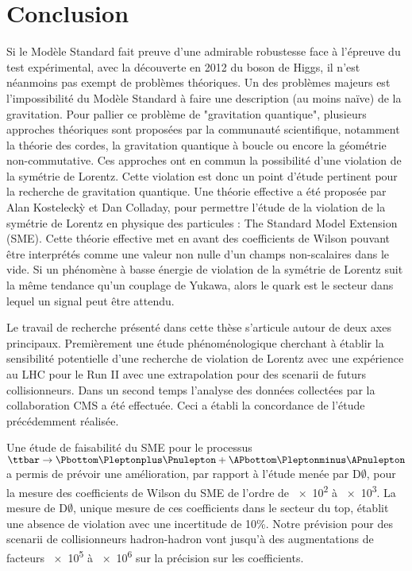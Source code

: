 \chapter*{Conclusion}

Si le Modèle Standard fait preuve d'une admirable robustesse face à l'épreuve du test expérimental, avec la découverte en 2012 du boson de Higgs, il n'est néanmoins pas exempt de problèmes théoriques. Un des problèmes majeurs est l'impossibilité du Modèle Standard à faire une description (au moins naïve) de la gravitation. Pour pallier ce problème de "gravitation quantique", plusieurs approches théoriques sont proposées par la communauté scientifique, notamment la théorie des cordes, la gravitation quantique à boucle ou encore la géométrie non-commutative. Ces approches ont en commun la possibilité d'une violation de la symétrie de Lorentz. Cette violation est donc un point d'étude pertinent pour la recherche de gravitation quantique. 
Une théorie effective a été proposée par Alan Kosteleck\`y et Dan Colladay, pour permettre l'étude de la violation de la symétrie de Lorentz en physique des particules : The Standard Model Extension (SME). Cette théorie effective met en avant des coefficients de Wilson pouvant être interprétés comme une valeur non nulle d'un champs non-scalaires dans le vide. Si un phénomène à basse énergie de violation de la symétrie de Lorentz suit la même tendance qu'un couplage de Yukawa, alors le quark \Ptop est le secteur dans lequel un signal peut être attendu.
\newline

Le travail de recherche présenté dans cette thèse s'articule autour de deux axes principaux. Premièrement une étude phénoménologique cherchant à établir la sensibilité potentielle d'une recherche de violation de Lorentz avec une expérience au LHC pour le Run II avec une extrapolation pour des scenarii de futurs collisionneurs. Dans un second temps l'analyse des données collectées par la collaboration CMS a été effectuée. Ceci a établi la concordance de l'étude précédemment réalisée. 
\newline


Une étude de faisabilité du SME pour le processus $\ttbar \rightarrow \Pbottom \Pleptonplus \Pnulepton +  \APbottom \Pleptonminus \APnulepton$ a permis de prévoir une amélioration, par rapport à l'étude menée par D$\emptyset$, pour la mesure des coefficients de Wilson du SME de l'ordre de \num{e2} à \num{e3}. La mesure de D$\emptyset$, unique mesure de ces coefficients dans le secteur du top, établit une absence de violation avec une incertitude de \num{10}{\%}. Notre prévision pour des scenarii de collisionneurs hadron-hadron vont jusqu'à des augmentations de facteurs   \num{e5} à \num{e6} sur la précision sur les coefficients. 

